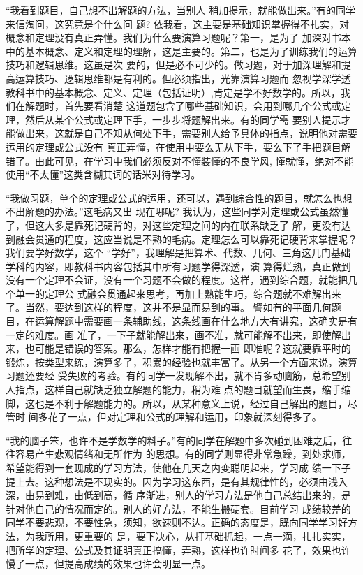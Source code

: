 \documentclass[twoside,openright,headings=optiontohead]{ctexbook} %
\begin{document}
{``我看到题目，自己想不出解题的方法，当别人 稍加提示，就能做出来。''有的同学来信淘问，这究竟是个什么问
题? 依我看，这主要是基础知识掌握得不扎实，对概念和定理没有真正弄懂。我们为什么要演算习题呢？第一，是为了
加深对书本中的基本概念、定义和定理的理解，这是主要的。第二，也是为了训练我们的运算技巧和逻辑思维。这虽是次
要的，但是必不可少的。做习题，对于加深理解和提高运算技巧、逻辑思维都是有利的。但必须指出，光靠演算习题而
忽视学深学透教科书中的基本概念、定义、定理（包括证明）,肯定是学不好数学的。所以，我们在解题时，首先要看消楚
这道题包含了哪些基础知识，会用到哪几个公式或定理，然后从某个公式或定理下手，一步步将题解出来。有的同学需
要别人提示才能做出来，这就是自己不知从何处下手，需要别人给予具体的指点，说明他对需要运用的定理或公式没有
真正弄懂，在使用中要么无从下手，要么下了手把题目解错了。由此可见，在学习中我们必须反对不懂装懂的不良学风,
懂就懂，绝对不能使用``不太懂''这类含糊其词的话米对待学习。

``我做习题，单个的定理或公式的运用，还可以，遇到综合性的题目，就怎么也想不出解题的办法。''这毛病又出
现在哪呢? 我认为，这些同学对定理或公式虽然懂了，但这大多是靠死记硬背的，对这些定理之间的内在联系缺乏了
解，更没有达到融会贯通的程度，这应当说是不熟的毛病。定理怎么可以靠死记硬背来掌握呢？我们要学好数学，这个
``学好''，我理解是把算术、代数、几何、三角这几门基础学科的内容，即教科书内容包括其中所有习题学得深透，演
算得烂熟，真正做到没有一个定理不会证，没有一个习题不会做的程度。这样，遇到综合题，就能把几个单一的定理公
式融会贯通起来思考，再加上熟能生巧，综合题就不难解出来了。当然，要达到这样的程度，这并不是显而易到的事。
譬如有的平面几何题目，在运算解题中需要画一条辅助线，这条线画在什么地方大有讲究，这确实是有一定的难度。画
准了，一下子就能解出来，画不准，就可能解不出来，即使解出来，也可能是错误的答案。那么，怎样才能有把握一画
即准呢？这就要靠平时的锻炼，按类型来练，演算多了，积累的经验也就丰富了。从另一个方面来说，演算习题还要经
受失败的考验。有的同学一发现解不出，就不肯多动脑筋，总希望别人指点，这样自己就缺乏独立解题的能力，稍为难
点的题目就望而生畏，缩手缩脚，这也是不利于解题能力的。所以，从某种意义上说，经过自己解出的题目，尽管时
间多花了一点，但对定理和公式的理解和运用，印象就深刻得多了。

``我的脑子笨，也许不是学数学的料子。''有的同学在解题中多次碰到困难之后，往往容易产生悲观情绪和无所作为
的思想。有的同学则显得非常急躁，到处求师，希望能得到一套现成的学习方法，使他在几天之内变聪明起来，学习成
绩一下子提上去。这种想法是不现实的。因为学习这东西，是有其规律性的，必须由浅入深，由易到难，由低到高，循
序渐进，别人的学习方法是他自己总结出来的，是针对他自己的情况而定的。别人的好方法，不能生搬硬套。目前学习
成绩较差的同学不要悲观，不要性急，须知，欲速则不达。正确的态度是，既向同学学习好方法，为我所用，更重要的
是，要下决心，从打基础抓起，一点一滴，扎扎实实，把所学的定理、公式及其证明真正搞懂，弄熟，这样也许时间多
花了，效果也许慢了一点，但提高成绩的效果也许会明显一点。

}
\end{document}
